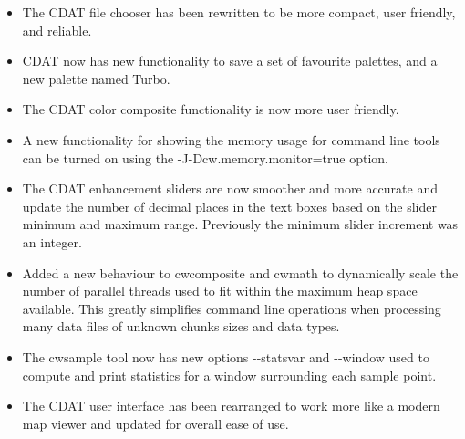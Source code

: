 \begin{itemize}
\item The CDAT file chooser has been rewritten to be more compact, user 
friendly, and reliable.

\item CDAT now has new functionality to save a set of favourite palettes, 
and a new palette named Turbo.

\item The CDAT color composite functionality is now more user friendly.

\item A new functionality for showing the memory usage for command line tools 
can be turned on using the -J-Dcw.memory.monitor=true option.

\item The CDAT enhancement sliders are now smoother and more accurate and 
update the number of decimal places in the text boxes based on the slider 
minimum and maximum range.  Previously the minimum slider increment was an 
integer.

\item Added a new behaviour to cwcomposite and cwmath to dynamically scale
the number of parallel threads used to fit within the maximum heap space
available.  This greatly simplifies command line operations when processing
many data files of unknown chunks sizes and data types.

\item The cwsample tool now has new options -{-}statsvar and -{-}window 
used to compute and print statistics for a window surrounding each
sample point.

\item The CDAT user interface has been rearranged to work more like a modern
map viewer and updated for overall ease of use.

\end{itemize}

